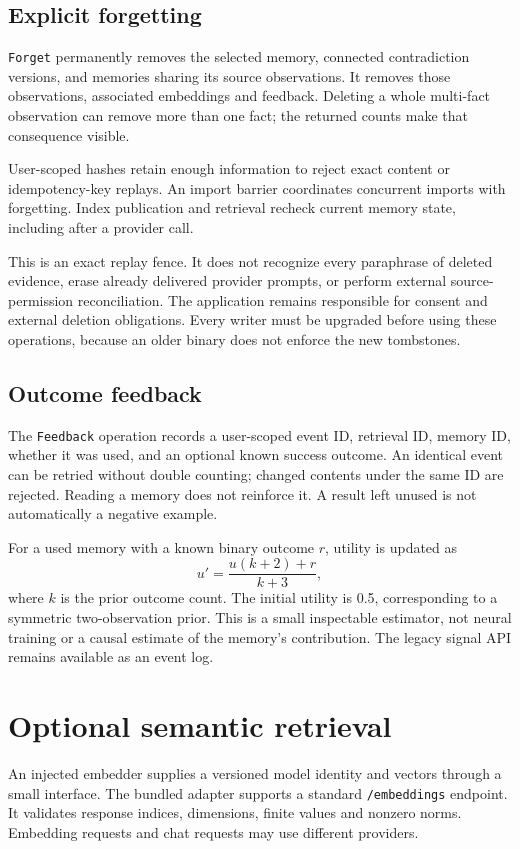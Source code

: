 \documentclass[11pt]{article}
\begin{document}
\subsection{Explicit forgetting}
\texttt{Forget} permanently removes the selected memory, connected contradiction versions, and memories sharing its source observations. It removes those observations, associated embeddings and feedback. Deleting a whole multi-fact observation can remove more than one fact; the returned counts make that consequence visible.

User-scoped hashes retain enough information to reject exact content or idempotency-key replays. An import barrier coordinates concurrent imports with forgetting. Index publication and retrieval recheck current memory state, including after a provider call.

This is an exact replay fence. It does not recognize every paraphrase of deleted evidence, erase already delivered provider prompts, or perform external source-permission reconciliation. The application remains responsible for consent and external deletion obligations. Every writer must be upgraded before using these operations, because an older binary does not enforce the new tombstones.

\subsection{Outcome feedback}
The \texttt{Feedback} operation records a user-scoped event ID, retrieval ID, memory ID, whether it was used, and an optional known success outcome. An identical event can be retried without double counting; changed contents under the same ID are rejected. Reading a memory does not reinforce it. A result left unused is not automatically a negative example.

For a used memory with a known binary outcome $r$, utility is updated as
\[
u'=\frac{u(k+2)+r}{k+3},
\]
where $k$ is the prior outcome count. The initial utility is 0.5, corresponding to a symmetric two-observation prior. This is a small inspectable estimator, not neural training or a causal estimate of the memory's contribution. The legacy signal API remains available as an event log.

\section{Optional semantic retrieval}
An injected embedder supplies a versioned model identity and vectors through a small interface. The bundled adapter supports a standard \texttt{/embeddings} endpoint. It validates response indices, dimensions, finite values and nonzero norms. Embedding requests and chat requests may use different providers.
\end{document}
